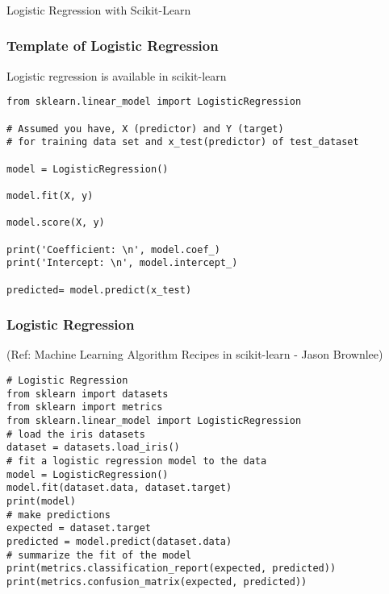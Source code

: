 \begin{frame}[fragile]\frametitle{}
\begin{center}
{\Large Logistic Regression with Scikit-Learn}
\end{center}
\end{frame}


\begin{frame}[fragile]\frametitle{Template of Logistic Regression}
Logistic regression is available in scikit-learn
\begin{lstlisting}
from sklearn.linear_model import LogisticRegression 

# Assumed you have, X (predictor) and Y (target) 
# for training data set and x_test(predictor) of test_dataset 

model = LogisticRegression() 

model.fit(X, y) 

model.score(X, y) 

print('Coefficient: \n', model.coef_) 
print('Intercept: \n', model.intercept_) 

predicted= model.predict(x_test) 
\end{lstlisting}

\end{frame}



\begin{frame}[fragile]\frametitle{Logistic Regression}

{\tiny (Ref: Machine Learning Algorithm Recipes in scikit-learn - Jason Brownlee)}


\begin{lstlisting}
# Logistic Regression
from sklearn import datasets
from sklearn import metrics
from sklearn.linear_model import LogisticRegression
# load the iris datasets
dataset = datasets.load_iris()
# fit a logistic regression model to the data
model = LogisticRegression()
model.fit(dataset.data, dataset.target)
print(model)
# make predictions
expected = dataset.target
predicted = model.predict(dataset.data)
# summarize the fit of the model
print(metrics.classification_report(expected, predicted))
print(metrics.confusion_matrix(expected, predicted))
\end{lstlisting}

\end{frame}




